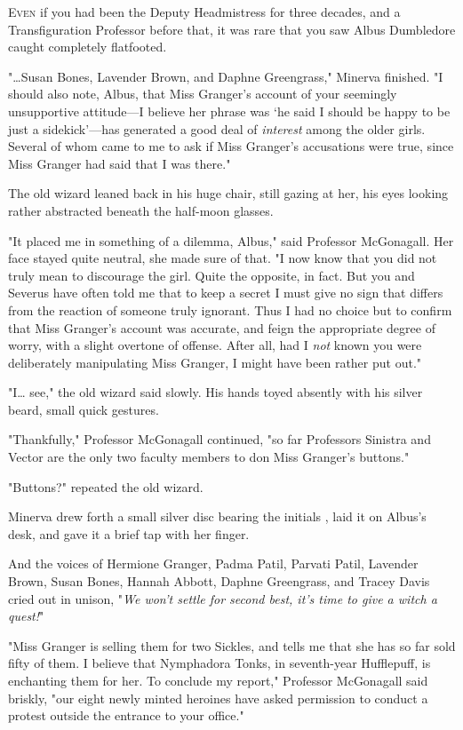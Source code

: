
\lettrine{E}{ven} if you had 
been the Deputy Headmistress for three decades, and a Transfiguration Professor 
before that, it was rare that you saw Albus Dumbledore caught completely 
flatfooted.

"{\ldots}Susan Bones, Lavender Brown, and Daphne Greengrass," Minerva finished. 
"I should also note, Albus, that Miss Granger's account of your seemingly 
unsupportive attitude---I believe her phrase was `he said I should be happy to 
be just a sidekick'---has generated a good deal of \emph{interest} among the 
older girls. Several of whom came to me to ask if Miss Granger's accusations 
were true, since Miss Granger had said that I was there."

The old wizard leaned back in his huge chair, still gazing at her, his eyes 
looking rather abstracted beneath the half-moon glasses.

"It placed me in something of a dilemma, Albus," said Professor McGonagall. Her 
face stayed quite neutral, she made sure of that. "I now know that you did not 
truly mean to discourage the girl. Quite the opposite, in fact. But you and 
Severus have often told me that to keep a secret I must give no sign that 
differs from the reaction of someone truly ignorant. Thus I had no choice but 
to confirm that Miss Granger's account was accurate, and feign the appropriate 
degree of worry, with a slight overtone of offense. After all, had I \emph{not} 
known you were deliberately manipulating Miss Granger, I might have been rather 
put out."

"I{\ldots} see," the old wizard said slowly. His hands toyed absently with his 
silver beard, small quick gestures.

"Thankfully," Professor McGonagall continued, "so far Professors Sinistra and 
Vector are the only two faculty members to don Miss Granger's buttons."

"Buttons?" repeated the old wizard.

Minerva drew forth a small silver disc bearing the initials \SPHEW, laid it 
on Albus's desk, and gave it a brief tap with her finger.

And the voices of Hermione Granger, Padma Patil, Parvati Patil, Lavender Brown, 
Susan Bones, Hannah Abbott, Daphne Greengrass, and Tracey Davis cried out in 
unison, "\emph{We won't settle for second best, it's time to give a witch a 
quest!}"

"Miss Granger is selling them for two Sickles, and tells me that she has so far 
sold fifty of them. I believe that Nymphadora Tonks, in seventh-year 
Hufflepuff, is enchanting them for her. To conclude my report," Professor 
McGonagall said briskly, "our eight newly minted heroines have asked permission 
to conduct a protest outside the entrance to your office."

